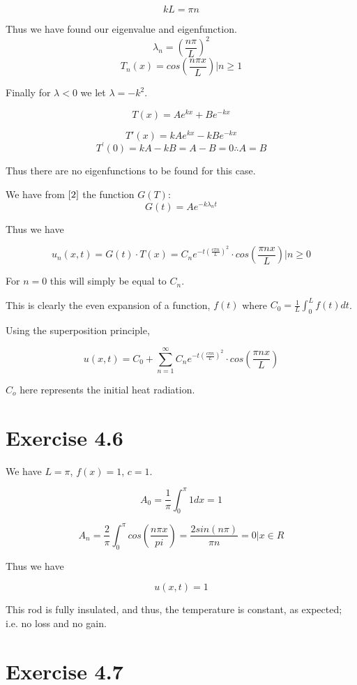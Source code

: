 \documentclass{article}
\begin{document}
$$kL=\pi n$$

Thus we have found our eigenvalue and eigenfunction.
$$\lambda_n = \left(\frac{n \pi}{L}\right)^2$$
$$T_n(x) = cos\left(\frac{n \pi x}{L}\right) \Bigr| n \geq 1$$


Finally for $\lambda < 0$ we let $\lambda = -k^2$.

$$T(x) = Ae^{kx} + Be^{-kx}$$

$$T'(x) = kAe^{kx} - kBe^{-kx}$$
$$T^{'}(0) = kA - kB = A-B = 0 \therefore A=B$$

Thus there are no eigenfunctions to be found for this case.

We have from $\eqref{2}$ the function $G(T)$:
$$G(t) = Ae^{-k\lambda_nt}$$

Thus we have

$$
u_n(x,t) = G(t) \cdot T(x) = C_n e^{-t\left(\frac{c \pi n}{L}\right)^2} \cdot cos\left(\frac{\pi n x}{L}\right) \Bigr| n \geq 0
$$

For $n=0$ this will simply be equal to $C_n$.

This is clearly the even expansion of a function, $f(t)$ where $C_0 = \frac{1}{L} \int_{0}^{L} f(t) dt$.

Using the superposition principle,

$$u(x,t) = C_0 + \sum_{n=1}^{\infty} C_n e^{-t\left(\frac{c \pi n}{L}\right)^2} \cdot cos\left(\frac{\pi n x}{L}\right) $$


$C_o$ here represents the initial heat radiation.



\section*{Exercise 4.6}

We have $L=\pi$, $f(x)=1$, $c=1$.

$$
A_0 = \frac{1}{\pi} \int_0^{\pi} 1dx = 1
$$

$$
A_n = \frac{2}{\pi} \int_0^{\pi} cos\left(\frac{n \pi x}{pi}\right) = \frac{2sin(n \pi)}{\pi n} = 0\Bigr| x \in R
$$

Thus we have

$$
u(x,t) = 1
$$

This rod is fully insulated, and thus, the temperature is constant, as expected; i.e. no loss and no gain.

\section*{Exercise 4.7}
\end{document}
